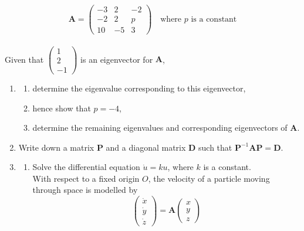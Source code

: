 \documentclass[leqno]{article}
\begin{document}
\begin{enumerate}[
  label=\textbf{\arabic*.},
  leftmargin=*,
  topsep=0pt,
  partopsep=0pt,
  parsep=0pt
]
\begin{djsSolution}
\begin{enumerate}[label=\textbf{(\alph*)}, start=1]
\end{enumerate}
\end{djsSolution}

\newpage

\questionitem

\[\mathbf{A} = \begin{pmatrix} -3 & 2 & -2 \\ -2 & 2 & p \\ 10 & -5 & 3 \end{pmatrix} \quad \text{where } p \text{ is a constant}\] \\
Given that $\begin{pmatrix} 1 \\ 2 \\ -1 \end{pmatrix}$ is an eigenvector for $\mathbf{A}$, \\
\begin{enumerate}[label=\textbf{(\alph*)}]
  \item
  \begin{enumerate}[label=(\roman*)]
    \item determine the eigenvalue corresponding to this eigenvector, 
    \item hence show that $p = -4$, 
    \item determine the remaining eigenvalues and corresponding eigenvectors of $\mathbf{A}$.  \\
  \end{enumerate}
  \item Write down a matrix $\mathbf{P}$ and a diagonal matrix $\mathbf{D}$ such that $\mathbf{P}^{-1}\mathbf{A}\mathbf{P} = \mathbf{D}$.  \\
  \item
  \begin{enumerate}[label=(\roman*)]
    \item Solve the differential equation $\dot{u} = ku$, where $k$ is a constant.  \\
    With respect to a fixed origin $O$, the velocity of a particle moving through space is modelled by
    \[\begin{pmatrix} \dot{x} \\ \dot{y} \\ \dot{z} \end{pmatrix} = \mathbf{A} \begin{pmatrix} x \\ y \\ z \end{pmatrix}\]

\end{enumerate}
\end{enumerate}
\end{enumerate}
\end{document}
